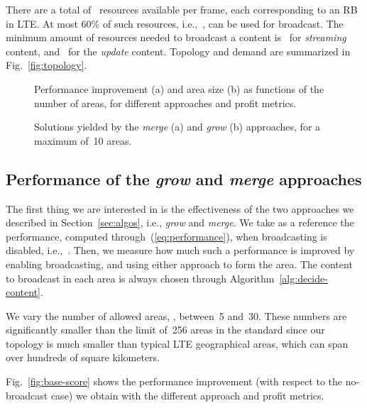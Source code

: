 \documentclass[10pt, conference, compsocconf]{IEEEtran}
\numberwithin{equation}{section}
\begin{document}
There are a total of~ resources available per frame, each
corresponding to an 
RB in LTE. At most  60\% of such resources, i.e.,~, can be
used for broadcast. The minimum amount of resources needed to broadcast
a content is~ for {\em streaming} content, and~ for
the {\em update} content.
Topology and demand are summarized in Fig.~\ref{fig:topology}.

\begin{figure}[t]
\centering
{}
\caption{Performance improvement (a) and area size (b) as  functions of the number 
of areas, for different approaches and profit metrics.
}
\end{figure}

\begin{figure}[b]
\centering
{}
\caption{
Solutions yielded by the {\em merge} (a) and {\em grow} (b) approaches,
for a maximum of~10 areas.
\label{fig:base-solutions}
}
\end{figure}

\subsection{Performance of the {\em grow} and {\em merge} approaches}

The first thing we are interested in is the effectiveness of the two
approaches we described in Section~\ref{sec:algos}, i.e., {\em grow} and
{\em merge}. We take as a reference the performance, computed
through~(\ref{eq:performance}), when broadcasting is disabled,
i.e.,~. Then, we measure how much such a
performance is improved by enabling broadcasting, and using either
approach to form the area. The content to broadcast in each area is
always chosen through Algorithm~\ref{alg:decide-content}.

We vary the number of allowed areas, , between~5 and~30. These numbers are
significantly smaller than the limit of~256 areas in the
standard since our topology is much smaller than typical LTE
geographical areas, which can span over hundreds of square kilometers.

Fig.~\ref{fig:base-score} shows the performance improvement (with respect to
the no-broadcast case) we obtain with the different approach and profit
metrics.
\end{document}
